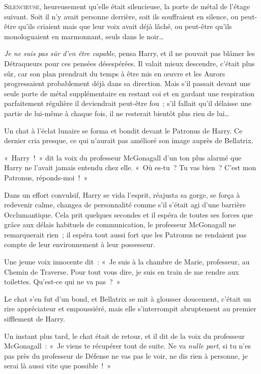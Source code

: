 
\lettrine{S}{ilencieuse}, heureusement qu'elle était silencieuse, la porte de métal de l'étage suivant.
Soit il n'y avait personne derrière, soit ils souffraient en silence, ou peut-être qu'ils criaient mais que leur voix avait déjà lâché, ou peut-être qu'ils monologuaient en marmonnant, seuls dans le noir…

\emph{Je ne suis pas sûr d'en être capable}, pensa Harry, et il ne pouvait pas blâmer les Détraqueurs pour ces pensées désespérées.
Il valait mieux descendre, c'était plus sûr, car son plan prendrait du temps à être mis en œuvre et les Aurors progressaient probablement déjà dans sa direction.
Mais s'il passait devant une seule porte de métal supplémentaire en restant coi et en gardant une respiration parfaitement régulière il deviendrait peut-être fou~; s'il fallait qu'il délaisse une partie de lui-même à chaque fois, il ne resterait bientôt plus rien de lui…

Un chat à l'éclat lunaire se forma et bondit devant le Patronus de Harry.
Ce dernier cria presque, ce qui n'aurait pas amélioré son image auprès de Bellatrix.

«~Harry~!~»
dit la voix du professeur McGonagall d'un ton plus alarmé que Harry ne l'avait jamais entendu chez elle.
«~Où es-tu~?
Tu vas bien~?
C'est mon Patronus, réponds-moi~!~»

Dans un effort convulsif, Harry se vida l'esprit, réajusta sa gorge, se força à redevenir calme, changea de personnalité comme s'il s'était agi d'une barrière Occlumantique.
Cela prit quelques secondes et il espéra de toutes ses forces que grâce aux délais habituels de communication, le professeur McGonagall ne remarquerait rien~; il espéra tout aussi fort que les Patronus ne rendaient pas compte de leur environnement à leur possesseur.

Une jeune voix innocente dit~: «~Je suis à la chambre de Marie, professeur, au Chemin de Traverse.
Pour tout vous dire, je suis en train de me rendre aux toilettes.
Qu'est-ce qui ne va pas~?~»

Le chat s'en fut d'un bond, et Bellatrix se mit à glousser doucement, c'était un rire appréciateur et empoussiéré, mais elle s'interrompit abruptement au premier sifflement de Harry.

Un instant plus tard, le chat était de retour, et il dit de la voix du professeur McGonagall~: «~Je viens te récupérer tout de suite.
Ne va \emph{nulle part}, si tu n'es pas près du professeur de Défense ne vas pas le voir, ne dis rien à personne, je serai là aussi vite que possible~!~»

